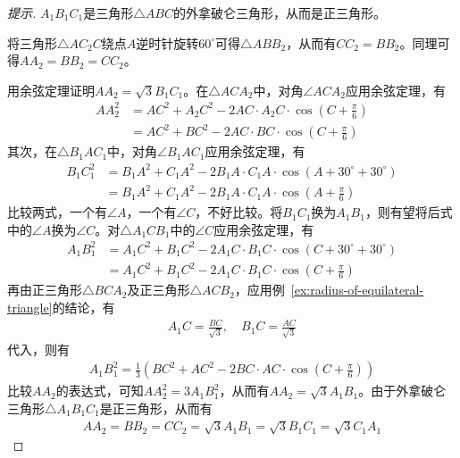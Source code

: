 \begin{example}[南京，1978]
\begin{center}
  \end{center}
\end{example}
\begin{proof}[提示]
  $A_1B_1C_1$是三角形$\triangle ABC$的外拿破仑三角形，从而是正三角形。

  将三角形$\triangle AC_2C$绕点$A$逆时针旋转$60^\circ$可得$\triangle ABB_2$，从而有$CC_2=BB_2$。同理可得$AA_2=BB_2=CC_2$。

  
  用余弦定理证明$AA_2=\sqrt3B_1C_1$。在$\triangle ACA_2$中，对角$\angle ACA_2$应用余弦定理，有
  \begin{align*}
    AA_2^2 &= AC^2 + A_2C^2 - 2AC\cdot A_2C\cdot\cos(C+\frac\pi6)\\
           &= AC^2 + BC^2 - 2AC\cdot BC\cdot\cos(C+\frac\pi6)
  \end{align*}
  其次，在$\triangle B_1AC_1$中，对角$\angle B_1AC_1$应用余弦定理，有
  \begin{align*}
    B_1C_1^2 & = B_1A^2 + C_1A^2 - 2B_1A\cdot C_1A\cdot \cos(A+30^\circ + 30^\circ) \\
             &= B_1A^2 + C_1A^2 - 2B_1A\cdot C_1A\cdot \cos(A+\frac\pi6)
  \end{align*}
  比较两式，一个有$\angle A$，一个有$\angle C$，不好比较。将$B_1C_1$换为$A_1B_1$，则有望将后式中的$\angle A$换为$\angle C$。对$\triangle A_1CB_1$中的$\angle C$应用余弦定理，有
  \begin{align*}
    A_1B_1^2 &= A_1C^2 + B_1C^2 - 2A_1C\cdot B_1C\cdot\cos(C + 30^\circ + 30^\circ)\\
             & = A_1C^2 + B_1C^2 - 2A_1C\cdot B_1C\cdot\cos(C + \frac\pi6)
  \end{align*}
  再由正三角形$\triangle BCA_2$及正三角形$\triangle ACB_2$，应用例~\ref{ex:radius-of-equilateral-triangle}的结论，有
  \begin{align*}
    A_1C = \frac{BC}{\sqrt3},\quad B_1C = \frac{AC}{\sqrt3}
  \end{align*}
  代入，则有
  \begin{align*}
    A_1B_1^2 = \frac13\left(BC^2 + AC^2 - 2 BC\cdot AC\cdot\cos(C + \frac\pi6)\right)
  \end{align*}
  比较$AA_2$的表达式，可知$AA_2^2 = 3A_1B_1^2$，从而有$AA_2=\sqrt3 A_1B_1$。由于外拿破仑三角形$\triangle A_1B_1C_1$是正三角形，从而有
  \begin{align*}
    AA_2=BB_2=CC_2=\sqrt3 A_1B_1 = \sqrt3 B_1C_1 = \sqrt3 C_1A_1
  \end{align*}
\end{proof}


